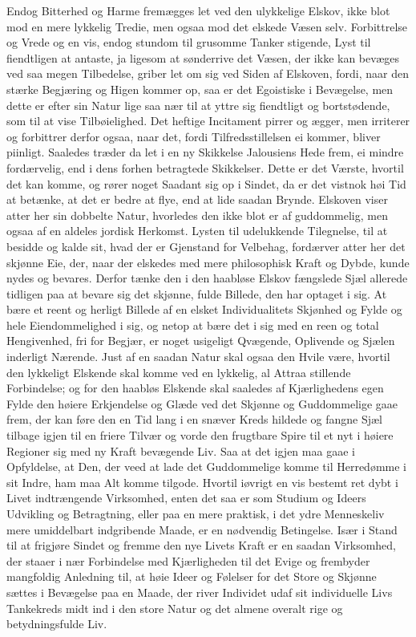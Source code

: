 \documentclass[12pt,a4paper]{book}
\newcommand{\apage}[1]{\marginnote{\footnotesize\textit{[#1]}}}
\begin{document}
Endog Bitterhed og Harme fremægges let ved den ulykkelige Elskov, ikke
blot mod en mere lykkelig Tredie, men ogsaa mod det elskede Væsen selv.
Forbittrelse og Vrede og en vis, endog stundom til grusomme Tanker
stigende, Lyst til fiendtligen at antaste, ja ligesom at sønderrive det
Væsen, der ikke kan bevæges ved saa megen Tilbedelse, griber let om sig
ved Siden af Elskoven, fordi, naar den stærke Begjæring og Higen \apage{163} kommer
op, saa er det Egoistiske i Bevægelse, men dette er efter sin Natur lige
saa nær til at yttre sig fiendtligt og bortstødende, som til at vise
Tilbøielighed. Det heftige Incitament pirrer og ægger, men irriterer og
forbittrer derfor ogsaa, naar det, fordi Tilfredsstillelsen ei kommer,
bliver piinligt. Saaledes træder da let i en ny Skikkelse Jalousiens Hede
frem, ei mindre fordærvelig, end i dens forhen betragtede Skikkelser.
Dette er det Værste, hvortil det kan komme, og rører noget Saadant sig op
i Sindet, da er det vistnok høi Tid at betænke, at det er bedre at flye,
end at lide saadan Brynde. Elskoven viser atter her sin dobbelte Natur,
hvorledes den ikke blot er af guddommelig, men ogsaa af en aldeles
jordisk Herkomst. Lysten til udelukkende Tilegnelse, til at besidde og
kalde sit, hvad der er Gjenstand for Velbehag, fordærver atter her det
skjønne Eie, der, naar der elskedes med mere philosophisk Kraft og Dybde,
kunde nydes og bevares. Derfor tænke den i den haabløse Elskov fængslede
Sjæl allerede tidligen paa at bevare sig det skjønne, fulde Billede, den
har optaget i sig. At bære et reent og herligt Billede af en elsket
Individualitets Skjønhed og Fylde og hele Eiendommelighed i sig, og netop
at bære det i sig med en reen og total Hengivenhed, fri for Begjær, er
noget usigeligt Qvægende, Oplivende og Sjælen inderligt Nærende. Just af
en saadan Natur skal ogsaa den Hvile være, hvortil den lykkeligt Elskende
skal komme ved en lykkelig, al Attraa stillende Forbindelse; og \apage{164} for den
haabløs Elskende skal saaledes af Kjærlighedens egen Fylde den høiere
Erkjendelse og Glæde ved det Skjønne og Guddommelige gaae frem, der kan
føre den en Tid lang i en snæver Kreds hildede og fangne Sjæl tilbage
igjen til en friere Tilvær og vorde den frugtbare Spire til et nyt i
høiere Regioner sig med ny Kraft bevægende Liv. Saa at det igjen maa gaae
i Opfyldelse, at Den, der veed at lade det Guddommelige komme til
Herredømme i sit Indre, ham maa Alt komme tilgode. Hvortil iøvrigt en vis
bestemt ret dybt i Livet indtrængende Virksomhed, enten det saa er som
Studium og Ideers Udvikling og Betragtning, eller paa en mere praktisk, i
det ydre Menneskeliv mere umiddelbart indgribende Maade, er en nødvendig
Betingelse. Især i Stand til at frigjøre Sindet og fremme den nye Livets
Kraft er en saadan Virksomhed, der staaer i nær Forbindelse med
Kjærligheden til det Evige og frembyder mangfoldig Anledning til, at høie
Ideer og Følelser for det Store og Skjønne sættes i Bevægelse paa en
Maade, der river Individet udaf sit individuelle Livs Tankekreds midt ind
i den store Natur og det almene overalt rige og betydningsfulde Liv.
\end{document}
